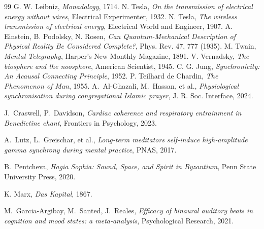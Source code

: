 \documentclass[12pt,a4paper]{article}
\begin{document}
	\begin{thebibliography}{99}
		 G. W. Leibniz, \emph{Monadology}, 1714.
		 N. Tesla, \emph{On the transmission of electrical energy without wires}, Electrical Experimenter, 1932.
		 N. Tesla, \emph{The wireless transmission of electrical energy}, Electrical World and Engineer, 1907.
		 A. Einstein, B. Podolsky, N. Rosen, \emph{Can Quantum-Mechanical Description of Physical Reality Be Considered Complete?}, Phys. Rev. 47, 777 (1935).
		 M. Twain, \emph{Mental Telegraphy}, Harper's New Monthly Magazine, 1891.
		 V. Vernadsky, \emph{The biosphere and the noosphere}, American Scientist, 1945.
		 C. G. Jung, \emph{Synchronicity: An Acausal Connecting Principle}, 1952.
		 P. Teilhard de Chardin, \emph{The Phenomenon of Man}, 1955.
		A.~Al-Ghazali, M.~Hassan, et al., 
		\emph{Physiological synchronisation during congregational Islamic prayer}, 
		J. R. Soc. Interface, 2024.
		
		J.~Craswell, P.~Davidson, 
		\emph{Cardiac coherence and respiratory entrainment in Benedictine chant}, 
		Frontiers in Psychology, 2023.
		
		A.~Lutz, L.~Greischar, et al., 
		\emph{Long‑term meditators self‑induce high‑amplitude gamma synchrony during mental practice}, 
		PNAS, 2017.
		
		B.~Pentcheva, 
		\emph{Hagia Sophia: Sound, Space, and Spirit in Byzantium}, 
		Penn State University Press, 2020.
		
		 K. Marx, \emph{Das Kapital}, 1867.
		
		M.~Garcia‑Argibay, M.~Santed, J.~Reales, 
		\emph{Efficacy of binaural auditory beats in cognition and mood states: a meta‑analysis}, 
		Psychological Research, 2021.
	\end{thebibliography}
	
\end{document}

